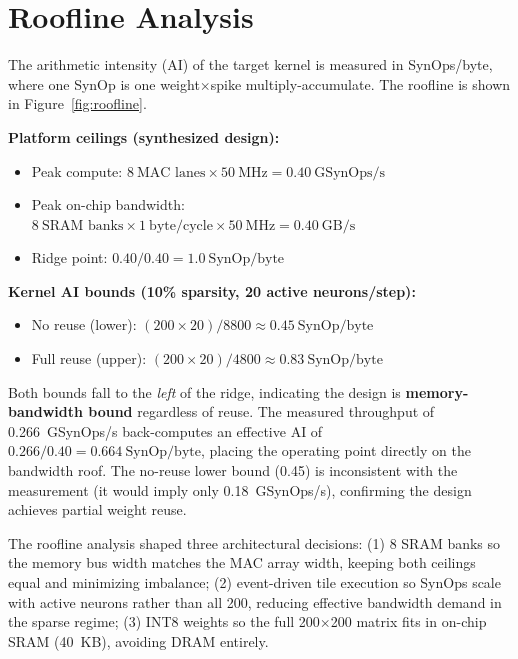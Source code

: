 \documentclass[11pt,letterpaper]{article}
\begin{document}
\section{Roofline Analysis}

The arithmetic intensity (AI) of the target kernel is measured in SynOps/byte,
where one SynOp is one weight$\times$spike multiply-accumulate. The roofline is
shown in Figure~\ref{fig:roofline}.

\textbf{Platform ceilings (synthesized design):}
\begin{itemize}
  \item Peak compute: $8\ \text{MAC lanes} \times 50\ \text{MHz} = 0.40\ \text{GSynOps/s}$
  \item Peak on-chip bandwidth: $8\ \text{SRAM banks} \times 1\ \text{byte/cycle} \times 50\ \text{MHz} = 0.40\ \text{GB/s}$
  \item Ridge point: $0.40 / 0.40 = 1.0\ \text{SynOp/byte}$
\end{itemize}

\textbf{Kernel AI bounds (10\% sparsity, 20 active neurons/step):}
\begin{itemize}
  \item No reuse (lower): $(200 \times 20) / 8800 \approx 0.45\ \text{SynOp/byte}$
  \item Full reuse (upper): $(200 \times 20) / 4800 \approx 0.83\ \text{SynOp/byte}$
\end{itemize}

Both bounds fall to the \emph{left} of the ridge, indicating the design is
\textbf{memory-bandwidth bound} regardless of reuse. The measured throughput of
0.266~GSynOps/s back-computes an effective AI of
$0.266 / 0.40 = 0.664\ \text{SynOp/byte}$, placing the operating point
directly on the bandwidth roof. The no-reuse lower bound (0.45) is inconsistent
with the measurement (it would imply only 0.18~GSynOps/s), confirming the
design achieves partial weight reuse.

The roofline analysis shaped three architectural decisions: (1) 8 SRAM banks
so the memory bus width matches the MAC array width, keeping both ceilings equal
and minimizing imbalance; (2) event-driven tile execution so SynOps scale with
active neurons rather than all 200, reducing effective bandwidth demand in the
sparse regime; (3) INT8 weights so the full 200$\times$200 matrix fits in
on-chip SRAM (40~KB), avoiding DRAM entirely.
\end{document}
